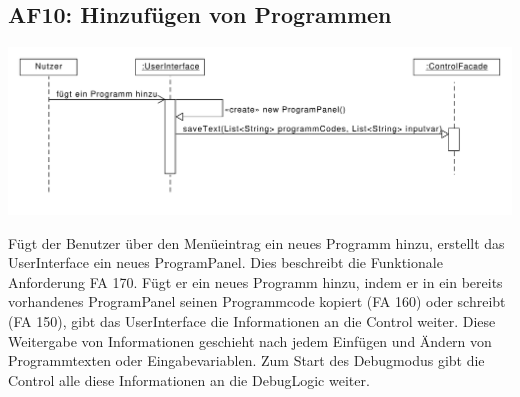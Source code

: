 \documentclass[parskip=full]{scrartcl}
\begin{document}
\newpage
\subsection{AF10: Hinzufügen von Programmen}
\begin{center}
\includegraphics[width=1.0\textwidth]{diagrammIdeenUmlet/SequenceDiagrams/seq_AF10PDF.pdf}
\end{center}
Fügt der Benutzer über den Menüeintrag ein neues Programm hinzu, erstellt das UserInterface ein
neues ProgramPanel. Dies beschreibt die Funktionale Anforderung FA 170.
Fügt er ein neues Programm hinzu, indem er in ein bereits vorhandenes ProgramPanel seinen Programmcode kopiert (FA 160) oder schreibt (FA 150), gibt das UserInterface die Informationen an die Control weiter.
Diese Weitergabe von Informationen geschieht nach jedem Einfügen und Ändern von Programmtexten oder Eingabevariablen. Zum Start des Debugmodus gibt die Control alle diese Informationen an die DebugLogic weiter.

\newpage
\end{document}
